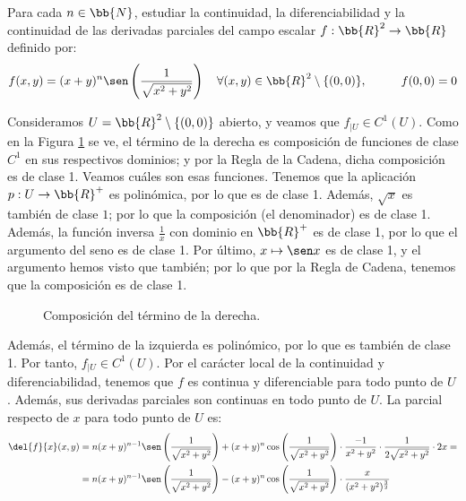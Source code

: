 \begin{ejercicio}
    Para cada $n \in \bb{N}$, estudiar la continuidad, la diferenciabilidad y la continuidad de las derivadas parciales del campo escalar $f : \bb{R}^2 \to \bb{R}$ definido por:
    \begin{equation*}
        f(x,y) = (x+y)^n \sen\left(\frac{1}{\sqrt{x^2+y^2}}\right) \quad \forall (x,y) \in \bb{R}^2\setminus\{(0,0)\},\hspace{1cm}
        f(0,0) = 0
    \end{equation*}

    Consideramos $U=\bb{R}^2\setminus\{(0,0)\}$ abierto, y veamos que $f_{\big| U}\in C^1({U})$. Como en la Figura \ref{fig:ComposicionSeno} se ve, el término de la derecha es composición de funciones de clase $C^1$ en sus respectivos dominios; y por la Regla de la Cadena, dicha composición es de clase 1. Veamos cuáles son esas funciones. Tenemos que la aplicación $p:U\to \bb{R}^+$ es polinómica, por lo que es de clase 1. Además, $\sqrt{x}$ es también de clase $1$; por lo que la composición (el denominador) es de clase 1. Además, la función inversa $\frac{1}{x}$ con dominio en $\bb{R}^+$ es de clase 1, por lo que el argumento del seno es de clase 1. Por último, $x \mapsto \sen x$ es de clase 1, y el argumento hemos visto que también; por lo que por la Regla de Cadena, tenemos que la composición es de clase 1.
    \begin{figure}[H]
        \centering
        \caption{Composición del término de la derecha.}
        \label{fig:ComposicionSeno}
    \end{figure}

    Además, el término de la izquierda es polinómico, por lo que es también de clase 1. Por tanto, $f_{\big| U}\in C^1(U)$. Por el carácter local de la continuidad y diferenciabilidad, tenemos que $f$ es continua y diferenciable para todo punto de $U$. Además, sus derivadas parciales son continuas en todo punto de $U$. La parcial respecto de $x$ para todo punto de $U$ es:
    \begin{equation*}\begin{split}
        \del{f}{x} (x,y) &= n(x+y)^{n-1}\sen\left(\dfrac{1}{\sqrt{x^2+y^2}}\right) +(x+y)^n \cos\left(\dfrac{1}{\sqrt{x^2+y^2}}\right)\cdot \frac{-1}{x^2+y^2} \cdot \frac{1}{2\sqrt{x^2+y^2}}\cdot 2x =\\
        &= n(x+y)^{n-1}\sen\left(\dfrac{1}{\sqrt{x^2+y^2}}\right) -(x+y)^n \cos\left(\dfrac{1}{\sqrt{x^2+y^2}}\right)\cdot \frac{x}{(x^2+y^2)^{\frac{3}{2}}}
    \end{split}\end{equation*}


\end{ejercicio}
